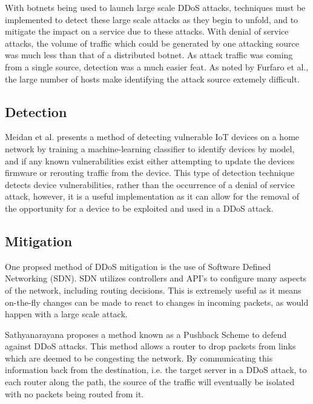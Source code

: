 With botnets being used to launch large scale DDoS attacks, techniques must be
implemented to detect these large scale attacks as they begin to unfold, and to
mitigate the impact on a service due to these attacks. With denial of service
attacks, the volume of traffic which could be generated by one attacking source
was much less than that of a distributed botnet. As attack traffic was coming
from a single source, detection was a much easier feat. As noted by Furfaro et
al.\cite{furfaro}, the large number of hosts make identifying the attack source
extemely difficult.

\subsection{Detection}

Meidan et al.\cite{meidan} presents a method of detecting vulnerable IoT devices on a
home network by training a machine-learning classifier to identify devices by
model, and if any known vulnerabilities exist either attempting to update the
devices firmware or rerouting traffic from the device. This type of detection
technique detects device vulnerabilities, rather than the occurrence of a denial
of service attack, however, it is a useful implementation as it can allow for
the removal of the opportunity for a device to be exploited and used in a DDoS
attack.

\subsection{Mitigation}

One propsed method of DDoS mitigation is the use of Software Defined Networking
(SDN). SDN utilizes controllers and API's to configure many aspects of the
network, including routing decisions. This is extremely useful as it means
on-the-fly changes can be made to react to changes in incoming packets, as would
happen with a large scale attack.

Sathyanarayana\cite{sdn} proposes a method known as a Pushback Scheme to defend
against DDoS attacks. This method allows a router to drop packets from links
which are deemed to be congesting the network. By communicating this information
back from the destination, i.e. the target server in a DDoS attack, to each
router along the path, the source of the traffic will eventually be isolated
with no packets being routed from it.
